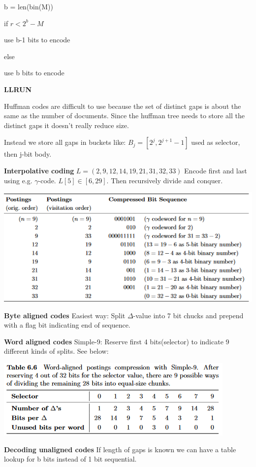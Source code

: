 \documentclass[a4paper,10pt,landscape]{article}
\begin{document}
\begin{multicols}{3}
b = len(bin(M))

if $r < 2^b-M$

    use b-1 bits to encode

else

    use b bits to encode

\textbf{LLRUN}

Huffman codes are difficult to use because the set of distinct gaps is about the same as the number of documents. Since the huffman tree needs to store all the distinct gaps it doesn't really reduce size.

Instead we store all gaps in buckets like:
$B_j = [2^j,2^{j+1}-1]$ used as selector, then j-bit body.

\textbf{Interpolative coding}
$L = (2,9,12,14,19,21,31,32,33)$
Encode first and last using e.g. $\gamma$-code. $L[5] \in [6,29]$. Then recursively divide and conquer.

\includegraphics[width=\linewidth]{images/interpolative.png}

\textbf{Byte aligned codes}
Easiest way: Split $\Delta$-value into 7 bit chucks and prepend with a flag bit indicating end of sequence.

\textbf{Word aligned codes}
Simple-9: Reserve first 4 bits(selector) to indicate 9 different kinds of splits. See below:

\includegraphics[width=\linewidth]{images/simple9.png}

\textbf{Decoding unaligned codes}
If length of gaps is known we can have a table lookup for b bits instead of 1 bit sequential.


\end{multicols}
\end{document}
